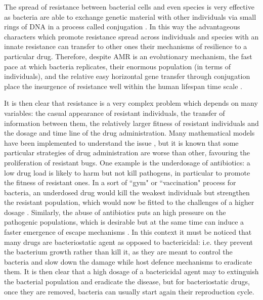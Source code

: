 The spread of resistance between bacterial cells and even species is very effective as bacteria are able to exchange genetic material with other individuals via small rings of DNA in a process called conjugation \cite{????}. In this way the advantageous characters which promote resistance spread across individuals and species with an innate resistance can transfer to other ones their mechanisms of resilience to a particular drug.
%
Therefore, despite AMR is an evolutionary mechanism, the fast pace at which bacteria replicates, their enormous population (in terms of individuals), and the relative easy horizontal gene transfer through conjugation place the insurgence of resistance well within the human lifespan time scale \cite{????}.

It is then clear that resistance is a very complex problem which depends on many variables: the casual appearance of resistant individuals, the transfer of information between them, the relatively larger fitness of resistant individuals and the dosage and time line of the drug administration. Many mathematical models have been implemented to understand the issue \cite{Birkegard2018,Niewiadomska2019}, but it is known that some particular strategies of drug administration are worse than other, favouring the proliferation of resistant bugs.
%
One example is the underdosage of antibiotics: a low drug load is likely to harm but not kill pathogens, in particular to promote the fitness of resistant ones. In a sort of ``gym" or ``vaccination" process for bacteria, an underdosed drug would kill the weakest individuals but strengthen the resistant population, which would now be fitted to the challenges of a higher dosage \cite{????}.
%
Similarly, the abuse of antibiotics puts an high pressure on the pathogenic populations, which is desirable but at the same time can induce a faster emergence of escape mechanisms \cite{????}.
%
In this context it must be noticed that many drugs are bacteriostatic agent as opposed to bactericidal: i.e. they prevent the bacterium growth rather than kill it, as they are meant to control the bacteria and slow down the damage while host defence mechanisms to eradicate them.
%
It is then clear that a high dosage of a bactericidal agent may to extinguish the bacterial population and eradicate the disease, but for bacteriostatic drugs, once they are removed, bacteria can usually start again their reproduction cycle.

